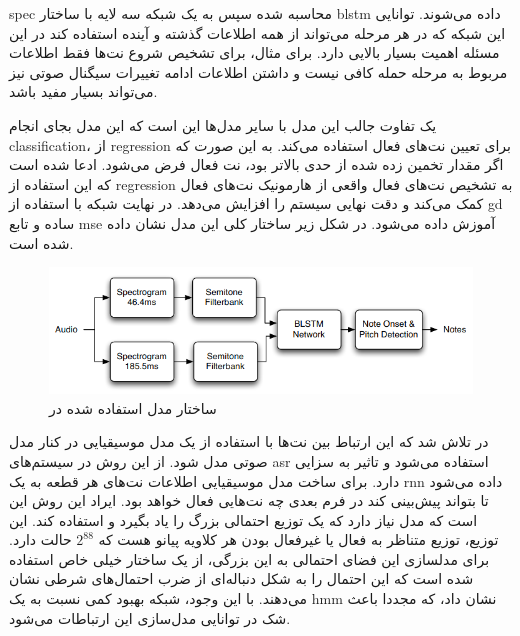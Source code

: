 \gls{spec} محاسبه شده سپس به یک شبکه سه لایه با ساختار \gls{blstm} داده می‌شوند.
توانایی این شبکه که در هر مرحله می‌تواند از همه اطلاعات گذشته و آینده استفاده
کند در این مسئله اهمیت بسیار بالایی دارد. برای مثال، برای تشخیص شروع نت‌ها فقط
اطلاعات مربوط به مرحله حمله کافی نیست و داشتن اطلاعات ادامه تغییرات سیگنال صوتی
نیز می‌تواند بسیار مفید باشد.

یک تفاوت جالب این مدل با سایر مدل‌ها این است که این مدل بجای انجام
\gls{classification}، از \gls{regression} برای تعیین نت‌های فعال استفاده می‌کند.
به این صورت که اگر مقدار تخمین زده شده از حدی بالاتر بود، نت فعال فرض می‌شود.
ادعا شده است که این استفاده از \gls{regression} به تشخیص نت‌های فعال واقعی از
هارمونیک نت‌های فعال کمک می‌کند و دقت نهایی سیستم را افزایش می‌دهد. در نهایت
شبکه با استفاده از \gls{gd} ساده و تابع \gls{mse} آموزش داده می‌شود. در شکل
زیر ساختار کلی این مدل نشان داده شده است.
\begin{figure}[ht]
    \centering
    \includegraphics[width=12cm]{./statics/bock2012polyphonic_architecture.png}
    \caption{ساختار مدل استفاده شده در \cite{bock2012polyphonic}}
\end{figure}

در \cite{sigtia2016end} تلاش شد که این ارتباط بین نت‌ها با استفاده از یک مدل
موسیقیایی در کنار مدل صوتی مدل شود. از این روش در سیستم‌های \gls{asr} استفاده
می‌شود و تاثیر به سزایی دارد. برای ساخت مدل موسیقیایی اطلاعات نت‌های هر قطعه به
یک \gls{rnn} داده می‌شود تا بتواند پیش‌بینی کند در فرم بعدی چه نت‌هایی فعال خواهد
بود. ایراد این روش این است که مدل نیاز دارد که یک توزیع احتمالی بزرگ را یاد
بگیرد و استفاده کند. این توزیع، توزیع متناظر به فعال یا غیرفعال بودن هر کلاویه
پیانو هست که $2^{88}$ حالت دارد. برای مدلسازی این فضای احتمالی به این بزرگی، از
یک ساختار خیلی خاص استفاده شده است که این احتمال را به شکل دنباله‌ای از ضرب
احتمال‌های شرطی نشان می‌دهند. با این وجود، شبکه بهبود کمی نسبت به یک \gls{hmm}
نشان داد، که مجددا باعث شک در توانایی مدل‌سازی این ارتباطات می‌شود.


